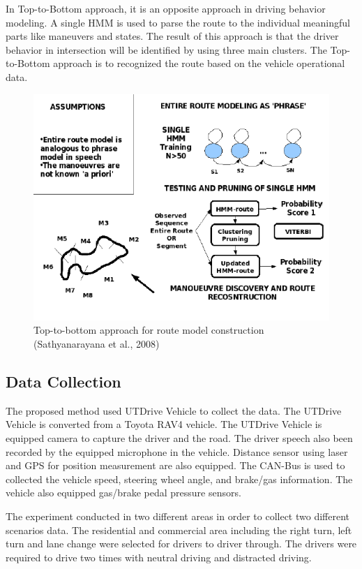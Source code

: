 In Top-to-Bottom approach, it is an opposite approach in driving behavior modeling. A single HMM is used to parse the route to the individual meaningful parts like maneuvers and states. The result of this approach is that the driver behavior in intersection will be identified by using three main clusters. The Top-to-Bottom approach is to recognized the route based on the vehicle operational data.

\begin{figure}[hbt!]\centering
\includegraphics[width=.75\textwidth]{image/ToptoBottom}
\caption{Top-to-bottom approach for route model construction (Sathyanarayana et al., 2008)}
\end{figure}

\subsection{Data Collection}
The proposed method used UTDrive Vehicle to collect the data. The UTDrive Vehicle is converted from a Toyota RAV4 vehicle. The UTDrive Vehicle is equipped camera to capture the driver and the road. The driver speech also been recorded by the equipped microphone in the vehicle. Distance sensor using laser and GPS for position measurement are also equipped. The CAN-Bus is used to collected the vehicle speed, steering wheel angle, and brake/gas information. The vehicle also equipped gas/brake pedal pressure sensors. 

The experiment conducted in two different areas in order to collect two different scenarios data. The residential and commercial area including the right turn, left turn and lane change were selected for drivers to driver through. The drivers were required to drive two times with neutral driving and distracted driving. 
 
